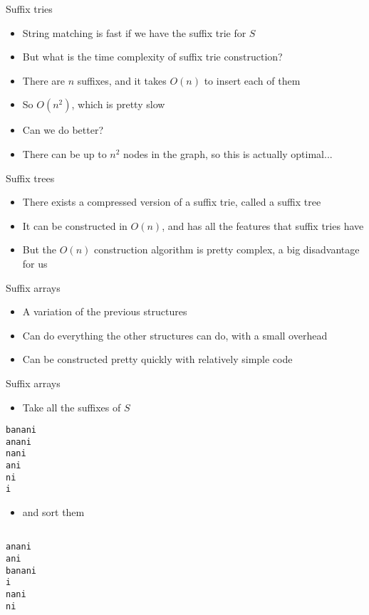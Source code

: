 \documentclass[12pt,t]{beamer}
\newcommand{\bi}{\begin{itemize}}
\newcommand{\ei}{\end{itemize}}
\begin{document}
\begin{frame}{Suffix tries}
    \vspace{20pt}
    \bi
        \item String matching is fast if we have the suffix trie for $S$
            \vspace{10pt}
        \item But what is the time complexity of suffix trie construction?
        \item There are $n$ suffixes, and it takes $O(n)$ to insert each of them
        \item So $O(n^2)$, which is pretty slow
            \vspace{10pt}
        \item Can we do better?
        \item There can be up to $n^2$ nodes in the graph, so this is actually optimal...
    \ei
\end{frame}

\begin{frame}{Suffix trees}
    \vspace{30pt}
    \bi
        \item There exists a compressed version of a suffix trie, called a suffix tree
        \vspace{10pt}
    \item It can be constructed in $O(n)$, and has all the features that suffix tries have
    \item But the $O(n)$ construction algorithm is pretty complex, a big disadvantage for us
    \ei
\end{frame}

\begin{frame}{Suffix arrays}
    \vspace{30pt}
    \bi
        \item A variation of the previous structures
        \item Can do everything the other structures can do, with a small overhead
        \item Can be constructed pretty quickly with relatively simple code
    \ei
\end{frame}

\begin{frame}[fragile]{Suffix arrays}
    \bi
        \item Take all the suffixes of $S$
    \ei
    \begin{verbatim}
banani
anani
nani
ani
ni
i

    \end{verbatim}
    \bi
        \item and sort them
    \ei
    \begin{verbatim}

anani
ani
banani
i
nani
ni
    \end{verbatim}

\end{frame}
\end{document}
